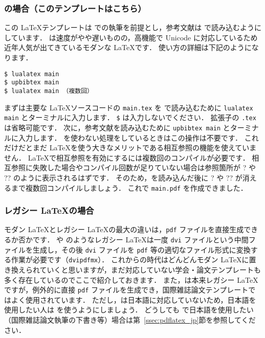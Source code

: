 \subsubsection*{\LuaLaTeX の場合（このテンプレートはこちら）}

この \LaTeX テンプレートは \LuaLaTeX での執筆を前提とし，参考文献は \upBibTeX で読み込むようにしています．
\LuaLaTeX は速度がやや遅いものの，高機能で Unicode に対応しているため近年人気が出てきているモダンな \LaTeX です．
使い方の詳細は下記のようになります．

\begin{tcolorbox}[enhanced, title=\LuaLaTeX$+$\upBibTeX, drop fuzzy shadow]
\begin{verbatim}
$ lualatex main
$ upbibtex main
$ lualatex main （複数回）
\end{verbatim}
\end{tcolorbox}

まずは主要な \LaTeX ソースコードの \verb|main.tex| を \LuaLaTeX で読み込むために \verb|lualatex main| とターミナルに入力します．
\verb|$| は入力しないでください．
拡張子の \verb|.tex| は省略可能です．
次に，参考文献を読み込むために \verb|upbibtex main| とターミナルに入力します．
\BibTeX を使わない処理をしているときはこの操作は不要です．
これだけだとまだ \LaTeX を使う大きなメリットである相互参照の機能を使えていません．
\LaTeX で相互参照を有効にするには複数回のコンパイルが必要です．
相互参照に失敗した場合やコンパイル回数が足りていない場合は参照箇所が ? や ?? のように表示されるはずです．
そのため，\upBibTeX を読み込んだ後に ? や ?? が消えるまで複数回コンパイルしましょう．
これで \verb|main.pdf| を作成できました．

\subsubsection*{レガシー \LaTeX の場合}

モダン \LaTeX とレガシー \LaTeX の最大の違いは，\verb|pdf| ファイルを直接生成できるか否かです．
\pLaTeX や \upLaTeX のようなレガシー \LaTeX は一度 \verb|dvi| ファイルという中間ファイルを生成し，その後 \verb|dvi| ファイルを \verb|pdf| 等の適切なファイル形式に変換する作業が必要です（\verb|dvipdfmx|）．
これからの時代はどんどんモダン \LaTeX に置き換えられていくと思いますが，まだ対応していない学会・論文テンプレートも多く存在しているのでここで紹介しておきます．
また，\pdfLaTeX は本来レガシー \LaTeX ですが，例外的に直接 \verb|pdf| ファイルを生成でき，国際雑誌論文テンプレートではよく使用されています．
ただし，\pdfLaTeX は日本語に対応していないため，日本語を使用したい人は \LuaLaTeX を使うようにしましょう．
どうしても \pdfLaTeX で日本語を使用したい（国際雑誌論文執筆の下書き等）場合は第~\ref{ssec:pdflatex_jp}節を参照してください．


